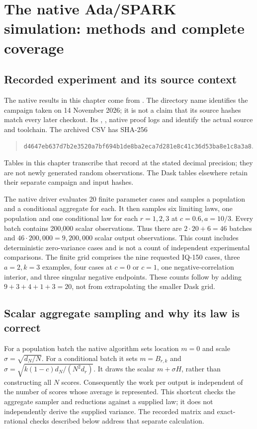 \chapter{The native Ada/SPARK simulation: methods and complete coverage}
\label{sec:seq-sim-spark}

\section{Recorded experiment and its source context}
The native results in this chapter come from
.
The directory name identifies the campaign taken on 14 November 2026;
it is not a claim that its source hashes match every later checkout.
Its , , native proof logs and
 identify the actual source and toolchain.
The archived CSV has SHA-256
\begin{quote}\small\ttfamily
\nolinkurl{d4647eb637d7b2e3520a7bf694b1de8ba2eca7d281e8c41c36d53ba8e1c8a3a8}.
\end{quote}
Tables in this chapter transcribe that record at the stated decimal
precision; they are not newly generated random observations. The Dask
tables elsewhere retain their separate campaign and input hashes.

The native driver evaluates 20 finite parameter cases and samples a
population and a conditional aggregate for each. It then samples six
limiting laws, one population and one conditional law for each
\(r=1,2,3\) at \(c=0.6,a=10/3\). Every batch contains 200,000
scalar observations. Thus there are \(2\cdot20+6=46\) batches and
\(46\cdot200{,}000=9{,}200{,}000\) scalar output observations.
This count includes deterministic zero-variance cases and is not a count
of independent experimental comparisons. The finite grid comprises the
nine requested IQ-150 cases, three \(a=2,k=3\) examples, four cases at
\(c=0\) or \(c=1\), one negative-correlation interior, and three
singular negative endpoints. These counts follow by adding
\(9+3+4+1+3=20\), not from extrapolating the smaller Dask grid.

\section{Scalar aggregate sampling and why its law is correct}
For a population batch the native algorithm sets location \(m=0\)
and scale \(\sigma=\sqrt{d_N/N}\). For a conditional batch it sets
\(m=B_{r,k}\) and
\(\sigma=\sqrt{k(1-c)d_N/(N^2d_r)}\). It draws the scalar
\(m+\sigma H\), rather than constructing all \(N\) scores.
Consequently the work per output is independent of the number of scores
whose average is represented. This shortcut checks the aggregate
sampler and reductions against a supplied law; it does not independently
derive the supplied variance. The recorded matrix and exact-rational
checks described below address that separate calculation.

